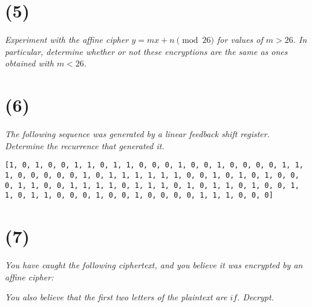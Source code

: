 \documentclass[12pt]{article}
\begin{document}
\section*{(5)} \textit{Experiment with the affine cipher $y = m x + n \pmod{26}$ for values of $m > 26$. In particular, determine whether or not these encryptions are the same as ones obtained with $m < 26$.}

\section*{(6)} \textit{The following sequence was generated by a linear feedback shift register. Determine the recurrence that generated it.}

\texttt{[1, 0, 1, 0, 0, 1, 1, 0, 1, 1, 0, 0, 0, 1, 0, 0, 1, 0, 0, 0, 0, 1, 1,
1, 0, 0, 0, 0, 0, 1, 0, 1, 1, 1, 1, 1, 1, 0, 0, 1, 0, 1, 0, 1, 0, 0,
0, 1, 1, 0, 0, 1, 1, 1, 1, 0, 1, 1, 1, 0, 1, 0, 1, 1, 0, 1, 0, 0, 1,
1, 0, 1, 1, 0, 0, 0, 1, 0, 0, 1, 0, 0, 0, 0, 1, 1, 1, 0, 0, 0]}

\section*{(7)} \textit{You have caught the following ciphertext, and you believe it was encrypted by an affine cipher:}


\textit{You also believe that the first two letters of the plaintext are $if$. Decrypt.}
\end{document}
